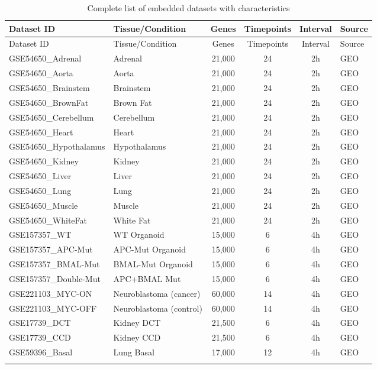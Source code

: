 \documentclass[11pt,a4paper]{article}
\begin{document}
\begin{longtable}{llcccl}
\toprule
Dataset ID & Tissue/Condition & Genes & Timepoints & Interval & Source \\
\midrule
\endfirsthead
\toprule
Dataset ID & Tissue/Condition & Genes & Timepoints & Interval & Source \\
\midrule
\endhead
GSE54650\_Adrenal & Adrenal & 21,000 & 24 & 2h & GEO \\
GSE54650\_Aorta & Aorta & 21,000 & 24 & 2h & GEO \\
GSE54650\_Brainstem & Brainstem & 21,000 & 24 & 2h & GEO \\
GSE54650\_BrownFat & Brown Fat & 21,000 & 24 & 2h & GEO \\
GSE54650\_Cerebellum & Cerebellum & 21,000 & 24 & 2h & GEO \\
GSE54650\_Heart & Heart & 21,000 & 24 & 2h & GEO \\
GSE54650\_Hypothalamus & Hypothalamus & 21,000 & 24 & 2h & GEO \\
GSE54650\_Kidney & Kidney & 21,000 & 24 & 2h & GEO \\
GSE54650\_Liver & Liver & 21,000 & 24 & 2h & GEO \\
GSE54650\_Lung & Lung & 21,000 & 24 & 2h & GEO \\
GSE54650\_Muscle & Muscle & 21,000 & 24 & 2h & GEO \\
GSE54650\_WhiteFat & White Fat & 21,000 & 24 & 2h & GEO \\
GSE157357\_WT & WT Organoid & 15,000 & 6 & 4h & GEO \\
GSE157357\_APC-Mut & APC-Mut Organoid & 15,000 & 6 & 4h & GEO \\
GSE157357\_BMAL-Mut & BMAL-Mut Organoid & 15,000 & 6 & 4h & GEO \\
GSE157357\_Double-Mut & APC+BMAL Mut & 15,000 & 6 & 4h & GEO \\
GSE221103\_MYC-ON & Neuroblastoma (cancer) & 60,000 & 14 & 4h & GEO \\
GSE221103\_MYC-OFF & Neuroblastoma (control) & 60,000 & 14 & 4h & GEO \\
GSE17739\_DCT & Kidney DCT & 21,500 & 6 & 4h & GEO \\
GSE17739\_CCD & Kidney CCD & 21,500 & 6 & 4h & GEO \\
GSE59396\_Basal & Lung Basal & 17,000 & 12 & 4h & GEO \\
\bottomrule
\caption{Complete list of embedded datasets with characteristics}
\end{longtable}
\end{document}
